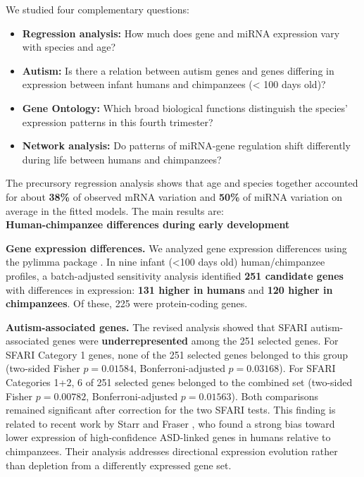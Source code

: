 \documentclass[11pt,letterpaper]{article}
\newcommand{\heading}[1]{\par\vspace{3pt}{\Large\bfseries #1}\par\vspace{0pt}}
\begin{document}
\heading{Questions}
We studied four complementary questions:
\begin{itemize}[leftmargin=1.35em,topsep=1pt,itemsep=1pt,parsep=0pt]
\item \textbf{Regression analysis:} How much does gene and miRNA expression vary with species and age?
\item \textbf{Autism:} Is there a relation between autism genes and genes differing in expression between infant humans and chimpanzees (< 100 days old)?
\item \textbf{Gene Ontology:} Which broad biological functions distinguish the species' expression patterns in this fourth trimester?
\item \textbf{Network analysis:} Do patterns of miRNA-gene regulation shift differently during life between humans and chimpanzees?\\
\end{itemize}

\newpage

\heading{Results}

The precursory regression analysis shows that age and species together accounted for about \textbf{38\%} of observed mRNA variation and \textbf{50\%} of miRNA variation on average in the fitted models. The main results are:\\


{\large \textbf{Human-chimpanzee differences during early development}}

\textbf{Gene expression differences.}
We analyzed gene expression differences using the pylimma package \cite{ri}. In nine infant (<100 days old) human/chimpanzee profiles, a batch-adjusted sensitivity analysis identified \textbf{251 candidate genes} with differences in expression: \textbf{131 higher in humans} and \textbf{120 higher in chimpanzees}. Of these, 225 were protein-coding genes.

\textbf{Autism-associated genes.}
The revised analysis showed that SFARI autism-associated genes were \textbf{underrepresented} among the 251 selected genes. For SFARI Category 1 genes, none of the 251 selected genes belonged to this group (two-sided Fisher $p=0.01584$, Bonferroni-adjusted $p=0.03168$). For SFARI Categories 1+2, 6 of 251 selected genes belonged to the combined set (two-sided Fisher $p=0.00782$, Bonferroni-adjusted $p=0.01563$). Both comparisons remained significant after correction for the two SFARI tests. This finding is related to recent work by Starr and Fraser \cite{st}, who found a strong bias toward lower expression of high-confidence ASD-linked genes in humans relative to chimpanzees. Their analysis addresses directional expression evolution rather than depletion from a differently expressed gene set.
\end{document}
